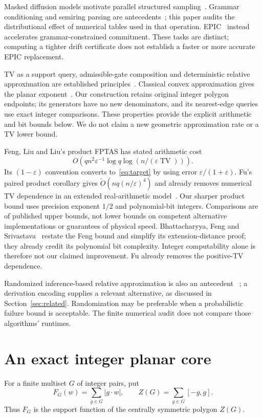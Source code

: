 \documentclass[11pt]{article}
\newcommand{\TV}{\operatorname{TV}}
\begin{document}
Masked diffusion models motivate parallel structured sampling~\cite{mdlm}.
Grammar conditioning and semiring parsing are antecedents~\cite{rivaud,goodman};
this paper audits the distributional effect of numerical tables used in that
operation. EPIC~\cite{epic} instead accelerates grammar-constrained commitment.
These tasks are distinct; computing a tighter drift certificate does not
establish a faster or more accurate EPIC replacement.

TV as a support query, admissible-gate composition and deterministic relative
approximation are established principles~\cite{fu}. Classical convex
approximation gives the planar exponent~\cite{dudley}. Our construction
retains original integer polygon endpoints; its generators have no new
denominators, and its nearest-edge queries use exact integer comparisons.
These properties provide the explicit arithmetic and bit bounds below.
We do not claim a new geometric approximation rate or a TV lower bound.

Feng, Liu and Liu's product FPTAS has stated arithmetic cost~\cite[Theorem 1]{feng}
\[
 O(qn^2\varepsilon^{-1}\log q\log(n/(\varepsilon\TV))).
\]
Its $(1-\varepsilon)$ convention converts to~\eqref{eq:target} by using
error $\varepsilon/(1+\varepsilon)$. Fu's paired product corollary gives
$\widetilde O(nq(n/\varepsilon)^4)$ and already removes numerical TV dependence
in an extended real-arithmetic model~\cite[Corollary 1.4]{fu}.
Our sharper product bound uses precision exponent $1/2$ and polynomial-bit
integers. Comparisons are of published upper bounds, not lower bounds on
competent alternative implementations or guarantees of physical speed.
Bhattacharyya, Feng and Srivastava~\cite[Sections 2--3]{gaussian} restate the
Feng bound and simplify its extension-distance proof; they already credit
its polynomial bit complexity. Integer computability alone is therefore
not our claimed improvement. Fu already removes the positive-TV dependence.

Randomized inference-based relative approximation is also an antecedent
~\cite{inference}; a derivation encoding supplies a relevant alternative,
as discussed in Section~\ref{sec:related}. Randomization may be preferable
when a probabilistic failure bound is acceptable. The finite numerical audit
does not compare those algorithms' runtimes.

\section{An exact integer planar core}
For a finite multiset $G$ of integer pairs, put
\[
 F_G(w)=\sum_{g\in G}|g\cdot w|,
 \qquad Z(G)=\sum_{g\in G}[-g,g].
\]
Thus $F_G$ is the support function of the centrally symmetric polygon $Z(G)$.
\end{document}
